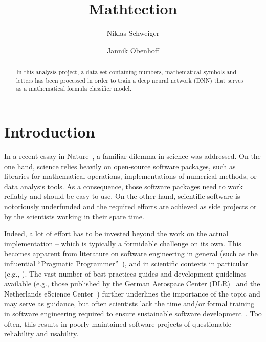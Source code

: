 \documentclass[@CLASSOPTIONS@]{tumarticle}
\title{Mathtection}
\author[affil={1}, email={niklas.schweiger@tum.de}]{Niklas Schweiger}
\author[affil={1}, email={jannik.obenhoff@tum.de}]{Jannik Obenhoff}
\affil{Department of Electrical and Computer Engineering, Technical
  University of Munich, Arcisstr. 21, 80333 Munich, Germany}
\begin{document}
\maketitle

\begin{abstract}
  In this analysis project, a data set containing numbers, mathematical
  symbols and letters has been processed in order to train a deep neural network (DNN) that
  serves as a mathematical formula classifier model.
\end{abstract}

\section{Introduction}

In a recent essay in Nature~\cite{nowogrodzki2019}, a familiar dilemma in
science was addressed. On the one hand, science relies heavily on
open-source software packages, such as libraries for mathematical operations,
implementations of numerical methods, or data analysis tools. As a
consequence, those software packages need to work reliably and should be
easy to use. On the other hand, scientific software is notoriously
underfunded and the required efforts are achieved as side projects or by the
scientists working in their spare time.

Indeed, a lot of effort has to be invested beyond the work on the actual
implementation -- which is typically a formidable challenge on its own. This
becomes apparent from literature on software engineering in general (such as
the influential ``Pragmatic Programmer''~\cite{hunt1999pragmatic}), and in
scientific contexts in particular (e.g.,
\cite{prlic2012, bangerth2013, wilson2014, wilson2017}). The vast number of
best practices guides and development guidelines available (e.g., those
published by the German Aerospace Center (DLR)~\cite{schlauch2018dlrguide}
and the Netherlands eScience Center~\cite{netherlands-guide2019}) further
underlines the importance of the topic and may serve as guidance, but often
scientists lack the time and/or formal training in software engineering
required to ensure sustainable software
development~\cite{nowogrodzki2019, wilson2014, wilson2017}. Too often, this
results in poorly maintained software projects of questionable reliability
and usability.
\end{document}
